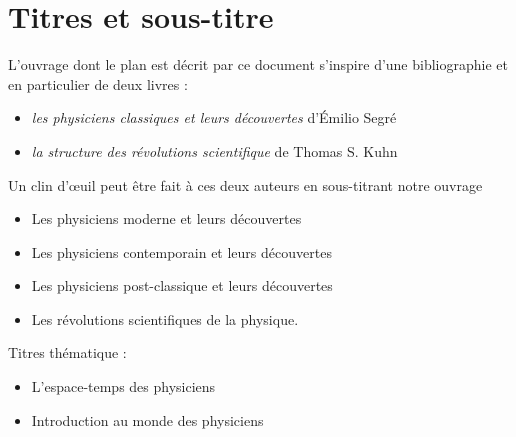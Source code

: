 
\section{Titres et sous-titre}

L'ouvrage dont le plan est décrit par ce document s'inspire d'une bibliographie et en particulier de deux livres :

\begin{itemize}[leftmargin=1cm, label=, itemsep=2pt]
\item {\it les physiciens classiques et leurs découvertes} d'Émilio Segré 
\item {\it la structure des révolutions scientifique} de Thomas S. Kuhn 
\end{itemize}

 Un clin d'{\oe}uil peut être fait à ces deux auteurs en sous-titrant notre ouvrage 

\begin{itemize}[leftmargin=1cm, label=, itemsep=2pt]
\item Les physiciens moderne et leurs découvertes
\item Les physiciens contemporain et leurs découvertes
\item Les physiciens post-classique et leurs découvertes
\item Les révolutions scientifiques de la physique.
\end{itemize}

Titres thématique :

\begin{itemize}[leftmargin=1cm, label=, itemsep=2pt]
\item L'espace-temps des physiciens
\item Introduction au monde des physiciens
\end{itemize}







